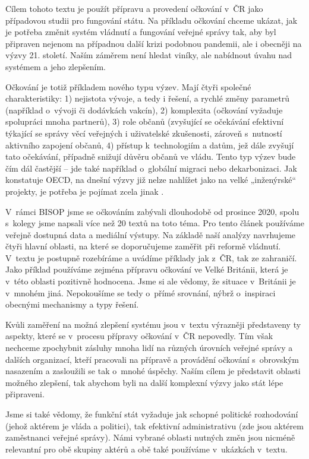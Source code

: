 Cílem tohoto textu je použít přípravu a provedení očkování v~ČR jako případovou studii pro fungování státu. Na příkladu očkování chceme ukázat, jak je potřeba změnit systém vládnutí a fungování veřejné správy tak, aby byl připraven nejenom na případnou další krizi podobnou pandemii, ale i obecněji na výzvy 21. století. Naším záměrem není hledat viníky, ale nabídnout úvahu nad systémem a jeho zlepšením.


Očkování je totiž příkladem nového typu výzev. Mají čtyři společné charakteristiky: 1) nejistota vývoje, a tedy i řešení, a rychlé změny parametrů (například o~vývoji či dodávkách vakcín), 2) komplexita (očkování vyžaduje spolupráci mnoha partnerů), 3) role občanů (zvyšující se očekávání efektivní týkající se správy věcí veřejných i uživatelské zkušenosti, zároveň s~nutností aktivního zapojení občanů, 4) přístup k~technologiím a datům, jež dále zvyšují tato očekávání, případně snižují důvěru občanů ve vládu. Tento typ výzev bude čím dál častější -- jde také například o~globální migraci nebo dekarbonizaci. Jak konstatuje OECD, na dnešní výzvy již nelze nahlížet jako na velké „inženýrské“ projekty, je potřeba je pojímat zcela jinak \cite{oecd_public_governance_reviews_skills_2020}.


V~rámci BISOP jsme se očkováním zabývali dlouhodobě od prosince 2020, spolu s~kolegy jsme napsali více než 20 textů na toto téma. Pro tento článek používáme veřejně dostupná data a mediální výstupy. Na základě naší analýzy navrhujeme čtyři hlavní oblasti, na které se doporučujeme zaměřit při reformě vládnutí. V~textu je postupně rozebíráme a uvádíme příklady jak z~ČR, tak ze zahraničí. Jako příklad používáme zejména přípravu očkování ve Velké Británii, která je v~této oblasti pozitivně hodnocena. Jsme si ale vědomy, že situace v~Británii je v~mnohém jiná. Nepokoušíme se tedy o~přímé srovnání, nýbrž o~inspiraci obecnými mechanismy a typy řešení.


Kvůli zaměření na možná zlepšení systému jsou v~textu výrazněji představeny ty aspekty, které se v~procesu přípravy očkování v~ČR nepovedly. Tím však nechceme zpochybnit zásluhy mnoha lidí na různých úrovních veřejné správy a dalších organizací, kteří pracovali na přípravě a provádění očkování s~obrovským nasazením a zasloužili se tak o~mnohé úspěchy. Naším cílem je představit oblasti možného zlepšení, tak abychom byli na další komplexní výzvy jako stát lépe připraveni.

Jsme si také vědomy, že funkční stát vyžaduje jak schopné politické rozhodování (jehož aktérem je vláda a politici), tak efektivní administrativu (zde jsou aktérem zaměstnanci veřejné správy). Námi vybrané oblasti nutných změn jsou nicméně relevantní pro obě skupiny aktérů a obě také používáme v~ukázkách v~textu. 

